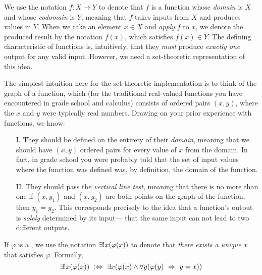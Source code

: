 \begin{intuition}[Function]
    We use the notation $f: X \to Y$ to denote that $f$ is a function
    whose \emph{domain} is $X$ and whose \emph{codomain} is $Y$,
    meaning that $f$ takes inputs from $X$ and produces values in $Y$.
    When we take an element $x \in X$ and \emph{apply} $f$ to $x$,
    we denote the produced result by the notation $f(x)$, which satisfies $f(x) \in Y$.
    The defining characteristic of functions is, intuitively,
    that they \emph{must} produce \emph{exactly one} output for any valid input.
    However, we need a set-theoretic representation of this idea.

    The simplest intuition here for the set-theoretic implementation is to think of the graph of a function,
    which (for the traditional real-valued functions you have encountered in grade school and calculus)
    consists of ordered pairs $(x, y)$, where the $x$ and $y$ were typically real numbers.
    Drawing on your prior experience with functions, we know:
    \begin{enumerate}
        \item[I.]
            They should be defined on the entirety of their \emph{domain},
            meaning that we should have $(x, y)$ ordered pairs for every value of $x$ from the domain.
            In fact, in grade school you were probably told that the set of input values
            where the function was defined was, by definition, the domain of the function.
        \item[II.]
            They should pass the \emph{vertical line test},
            meaning that there is no more than one if $(x, y_1)$ and $(x, y_2)$ are both points
            on the graph of the function, then $y_1 = y_2$.
            This corresponds precisely to the idea that
            a function's output is \emph{solely} determined by its input---%
            that the same input can not lead to two different outputs.
    \end{enumerate}
\end{intuition}

\begin{definition}
    If $\varphi$ is a {\wff}, we use the notation $\exists! x \pn*{\varphi(x)}$ to denote that
    \emph{there exists a unique} $x$ that satisfies $\varphi$.
    Formally,
    \[
        \exists! x \pn*{\varphi(x)} \iffdefn \exists x \pn*{\varphi(x) \meet \forall y \pn*{\varphi(y) \implies y = x}}
    \]
\end{definition}

